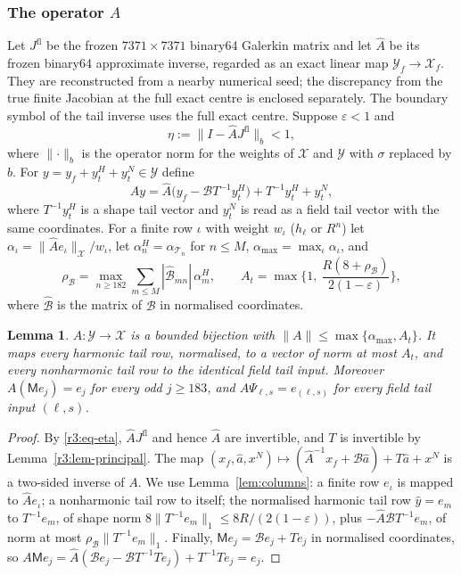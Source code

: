 \documentclass[11pt]{amsart}
\newtheorem{lemma}[theorem]{Lemma}
\theoremstyle{definition}
\theoremstyle{remark}
\numberwithin{equation}{section}
\newcommand{\eps}{\varepsilon}
\newcommand{\nrm}[1]{\lVert #1\rVert}
\begin{document}
\subsubsection*{The operator $A$}
Let $J^{\mathrm{fl}}$ be the frozen $7371\times7371$ binary64 Galerkin matrix and let $\widehat A$ be its frozen binary64 approximate inverse, regarded as an exact linear map $\mathcal Y_f\to\mathcal X_f$. They are reconstructed from a nearby numerical seed; the discrepancy from the true finite Jacobian at the full exact centre is enclosed separately. The boundary symbol of the tail inverse uses the full exact centre. Suppose $\eps<1$ and
\begin{equation}\label{r3:eq-eta}
\eta:=\nrm{I-\widehat AJ^{\mathrm{fl}}}_b<1,
\end{equation}
where $\nrm\cdot_b$ is the operator norm for the weights of $\mathcal X$ and $\mathcal Y$ with $\sigma$ replaced by $b$. For $y=y_f+y^H_t+y^N_t\in\mathcal Y$ define
\begin{equation}\label{r3:eq-A}
Ay=\widehat A\big(y_f-\mathcal BT^{-1}y^H_t\big)+T^{-1}y^H_t+y^N_t,
\end{equation}
where $T^{-1}y^H_t$ is a shape tail vector and $y^N_t$ is read as a field tail vector with the same coordinates. For a finite row $\iota$ with weight $w_\iota$ ($h_\ell$ or $R^n$) let $\alpha_\iota=\nrm{\widehat Ae_\iota}_{\mathcal X}/w_\iota$, let $\alpha^H_n=\alpha_{\mathcal T_n}$ for $n\leq M$, $\alpha_{\max}=\max_\iota\alpha_\iota$, and
\[
\rho_{\mathcal B}=\max_{n\geq182}\sum_{m\leq M}|\hat{\mathcal B}_{mn}|\,\alpha^H_m,\qquad A_t=\max\Big\{1,\ \frac{R(8+\rho_{\mathcal B})}{2(1-\eps)}\Big\},
\]
where $\hat{\mathcal B}$ is the matrix of $\mathcal B$ in normalised coordinates.

\begin{lemma}\label{r3:lem-A}
$A\colon\mathcal Y\to\mathcal X$ is a bounded bijection with $\nrm A\leq\max\{\alpha_{\max},A_t\}$. It maps every harmonic tail row, normalised, to a vector of norm at most $A_t$, and every nonharmonic tail row to the identical field tail input. Moreover $A(\mathsf Me_j)=e_j$ for every odd $j\geq183$, and $A\Psi_{\ell,s}=e_{(\ell,s)}$ for every field tail input $(\ell,s)$.
\end{lemma}

\begin{proof}
By \eqref{r3:eq-eta}, $\widehat AJ^{\mathrm{fl}}$ and hence $\widehat A$ are invertible, and $T$ is invertible by Lemma~\ref{r3:lem-principal}. The map $(x_f,\hat a,x^N)\mapsto(\widehat A^{-1}x_f+\mathcal B\hat a)+T\hat a+x^N$ is a two-sided inverse of $A$. We use Lemma~\ref{lem:columns}: a finite row $e_\iota$ is mapped to $\widehat Ae_\iota$; a nonharmonic tail row to itself; the normalised harmonic tail row $\hat y=e_m$ to $T^{-1}e_m$, of shape norm $8\nrm{T^{-1}e_m}_1\leq8R/(2(1-\eps))$, plus $-\widehat A\mathcal BT^{-1}e_m$, of norm at most $\rho_{\mathcal B}\nrm{T^{-1}e_m}_1$. Finally, $\mathsf Me_j=\mathcal Be_j+Te_j$ in normalised coordinates, so $A\mathsf Me_j=\widehat A(\mathcal Be_j-\mathcal BT^{-1}Te_j)+T^{-1}Te_j=e_j$.
\end{proof}
\end{document}
